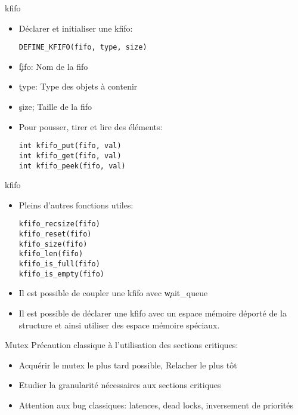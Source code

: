 \begin{frame}[fragile=singleslide]{kfifo}
  \begin{itemize}
  \item Déclarer et initialiser une kfifo: 
    \begin{lstlisting} 
DEFINE_KFIFO(fifo, type, size)
    \end{lstlisting} 
  \item \c{fifo}: Nom de la fifo
  \item \c{type}: Type des objets à contenir
  \item \c{size}; Taille de la fifo
  \item Pour pousser, tirer et lire des éléments:
    \begin{lstlisting} 
int kfifo_put(fifo, val) 
int kfifo_get(fifo, val)
int kfifo_peek(fifo, val)
    \end{lstlisting} 
  \end{itemize}
\end{frame}

\begin{frame}[fragile=singleslide]{kfifo}
  \begin{itemize}
  \item Pleins d'autres fonctions utiles:
    \begin{lstlisting}
kfifo_recsize(fifo)
kfifo_reset(fifo) 
kfifo_size(fifo)  
kfifo_len(fifo)
kfifo_is_full(fifo)
kfifo_is_empty(fifo)
    \end{lstlisting} 
  \item Il est possible de coupler une kfifo avec \c{wait_queue}
  \item Il est  possible de déclarer une kfifo  avec un espace mémoire
    déporté  de la  structure  et ainsi  utiliser  des espace  mémoire
    spéciaux.
  \end{itemize} 
\end{frame} 

\begin{frame}{Mutex}
  Précaution classique à l'utilisation des sections critiques:
  \begin{itemize}
  \item Acquérir le mutex le plus tard possible, Relacher le plus tôt
  \item Etudier la granularité nécessaires aux sections critiques
  \item   Attention  aux   bug  classiques:   latences,   dead  locks,
    inversement de priorités
  \end{itemize} 
\end{frame}

